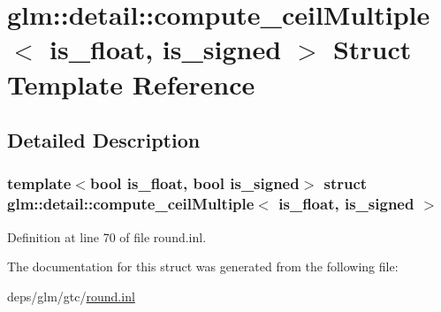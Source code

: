 \hypertarget{structglm_1_1detail_1_1compute__ceilMultiple}{}\section{glm\+:\+:detail\+:\+:compute\+\_\+ceil\+Multiple$<$ is\+\_\+float, is\+\_\+signed $>$ Struct Template Reference}
\label{structglm_1_1detail_1_1compute__ceilMultiple}


\subsection{Detailed Description}
\subsubsection*{template$<$bool is\+\_\+float, bool is\+\_\+signed$>$\newline
struct glm\+::detail\+::compute\+\_\+ceil\+Multiple$<$ is\+\_\+float, is\+\_\+signed $>$}



Definition at line 70 of file round.\+inl.



The documentation for this struct was generated from the following file\+:\begin{DoxyCompactItemize}
\item 
deps/glm/gtc/\hyperlink{round_8inl}{round.\+inl}\end{DoxyCompactItemize}
